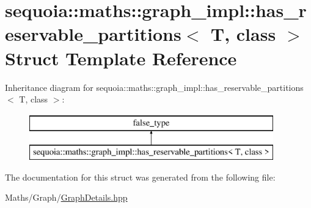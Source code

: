 \hypertarget{structsequoia_1_1maths_1_1graph__impl_1_1has__reservable__partitions}{}\section{sequoia\+::maths\+::graph\+\_\+impl\+::has\+\_\+reservable\+\_\+partitions$<$ T, class $>$ Struct Template Reference}
\label{structsequoia_1_1maths_1_1graph__impl_1_1has__reservable__partitions}
Inheritance diagram for sequoia\+::maths\+::graph\+\_\+impl\+::has\+\_\+reservable\+\_\+partitions$<$ T, class $>$\+:\begin{figure}[H]
\begin{center}
\leavevmode
\includegraphics[height=2.000000cm]{structsequoia_1_1maths_1_1graph__impl_1_1has__reservable__partitions}
\end{center}
\end{figure}


The documentation for this struct was generated from the following file\+:\begin{DoxyCompactItemize}
\item 
Maths/\+Graph/\mbox{\hyperlink{_graph_details_8hpp}{Graph\+Details.\+hpp}}\end{DoxyCompactItemize}
